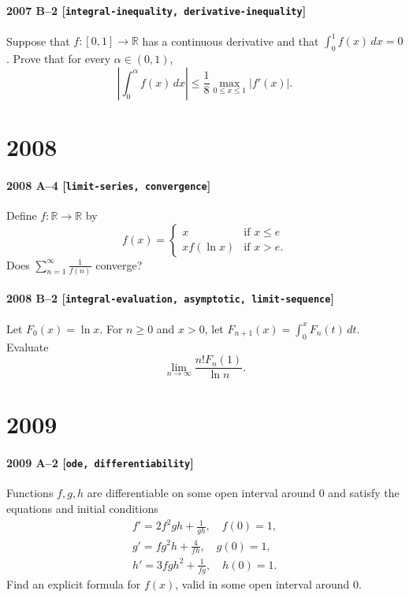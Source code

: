 \documentclass[11pt]{article}
\begin{document}
\paragraph{2007 B--2 \textnormal{[\texttt{integral-inequality, derivative-inequality}]}}
Suppose that $f: [0,1] \to \mathbb{R}$ has a continuous derivative
and that $\int_0^1 f(x)\,dx = 0$. Prove that for every $\alpha \in (0,1)$,
\[
\left| \int_0^\alpha f(x)\,dx \right| \leq \frac{1}{8} \max_{0 \leq x
\leq 1} |f'(x)|.
\]

\section*{2008}

\paragraph{2008 A--4 \textnormal{[\texttt{limit-series, convergence}]}}
Define $f: \mathbb{R} \to \mathbb{R}$ by
\[
f(x) = \begin{cases} x & \mbox{if $x \leq e$} \\ x f(\ln x) &
\mbox{if $x > e$.} \end{cases}
\]
Does $\sum_{n=1}^\infty \frac{1}{f(n)}$ converge?

\paragraph{2008 B--2 \textnormal{[\texttt{integral-evaluation, asymptotic, limit-sequence}]}}
Let $F_0(x) = \ln x$. For $n \geq 0$ and $x > 0$, let
$F_{n+1}(x) = \int_0^x F_n(t)\,dt$. Evaluate
\[
\lim_{n \to \infty} \frac{n! F_n(1)}{\ln n}.
\]

\section*{2009}

\paragraph{2009 A--2 \textnormal{[\texttt{ode, differentiability}]}}
Functions $f,g,h$ are differentiable on some open interval around $0$
and satisfy the equations and initial conditions
\begin{gather*}
f' = 2f^2gh+\frac{1}{gh},\quad f(0)=1, \\
g'=fg^2h+\frac{4}{fh}, \quad g(0)=1, \\
h'=3fgh^2+\frac{1}{fg}, \quad h(0)=1.
\end{gather*}
Find an explicit formula for $f(x)$, valid in some open interval around $0$.
\end{document}
